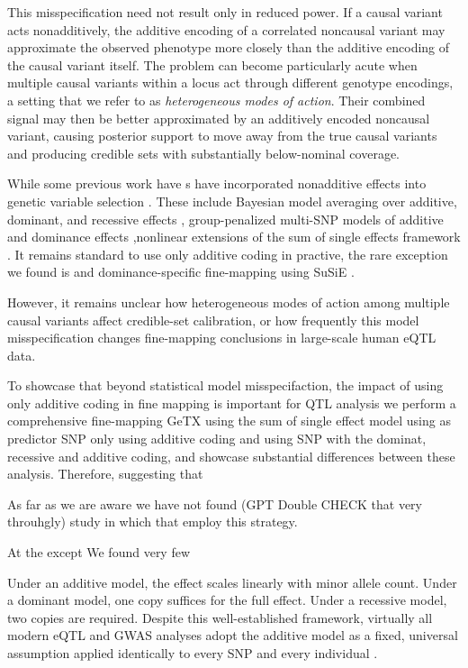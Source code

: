 \documentclass[12pt]{article}
\begin{document}
This misspecification need not result only in reduced power. If a
causal variant acts nonadditively, the additive encoding of a correlated
noncausal variant may approximate the observed phenotype more closely
than the additive encoding of the causal variant itself. The problem
can become particularly acute when multiple causal variants within a
locus act through different genotype encodings, a setting that we refer
to as \textit{heterogeneous modes of action}. Their combined signal may
then be better approximated by an additively encoded noncausal variant,
causing posterior support to move away from the true causal variants
and producing credible sets with substantially below-nominal coverage.

While some previous work have s have incorporated nonadditive effects into genetic
variable selection \cite{cheng_uncertainty_2022,peltola_bayesian_2012,sabourin_fine-mapping_2015}.
These include Bayesian model
averaging over additive, dominant, and recessive effects \cite{peltola_bayesian_2012}, group-penalized multi-SNP models of
additive and dominance effects \cite{sabourin_fine-mapping_2015},nonlinear extensions of the sum of single effects framework
\cite{cheng_uncertainty_2022}. 
It remains standard to use only additive coding in practive, the rare exception we found is and dominance-specific fine-mapping
using SuSiE \cite{palmer_analysis_2023}. 


 However, it remains unclear
how heterogeneous modes of action among multiple causal variants affect
credible-set calibration, or how frequently this model misspecification
changes fine-mapping conclusions in large-scale human eQTL data.


To showcase that beyond statistical model misspecifaction, the impact of using only additive coding in fine mapping is important for QTL analysis we perform a comprehensive fine-mapping GeTX \cite{gtex_consortium_gtex_2020} using the sum of single effect model \cite{wang_simple_2020} using as predictor SNP only using additive coding and using SNP with the dominat, recessive and additive coding, and showcase substantial differences between these analysis. Therefore, suggesting that 



As far as we are aware we have not found (GPT Double CHECK that very throuhgly)   study in which that employ this strategy. 


At the except
We found very few 




Under an
 additive  model, the effect scales
linearly with minor allele count. Under a dominant  model, one copy suffices for
the full effect. Under a recessive  model, two copies are
required. Despite this well-established framework, virtually all modern
eQTL and GWAS analyses adopt the additive  model as a fixed, universal assumption
applied identically to every SNP and every individual
\cite{wenstephens2014, sharepro2024}.
\end{document}
